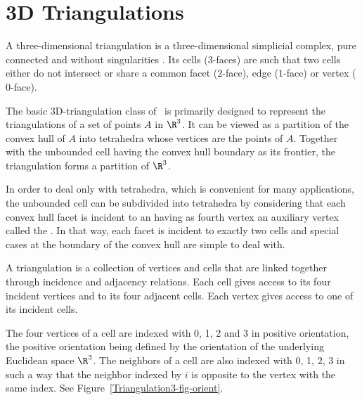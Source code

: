 

\chapter{3D Triangulations}

A three-dimensional triangulation is a three-dimensional simplicial
complex, pure connected and without singularities \cite{by-ag-98}. Its
cells ($3$-faces) are such that two cells either do not intersect or
share a common facet ($2$-face), edge ($1$-face) or vertex ($0$-face).

The basic 3D-triangulation class of \cgal\ is primarily designed to
represent the triangulations of a set of points $A$ in $\R^3$.  It can
be viewed as a partition of the convex hull of {$A$} into tetrahedra
whose vertices are the points of {$A$}.  Together with the unbounded
cell having the convex hull boundary as its frontier, the triangulation
forms a partition of $\R^3$.

In order to deal
only with tetrahedra, which is convenient for many applications, the
unbounded cell can be subdivided into tetrahedra by considering that
each convex hull facet is incident to an  having as
fourth vertex an auxiliary vertex called the .  In
that way, each facet is incident to exactly two cells and special cases
at the boundary of the convex hull are simple to deal with.


A triangulation is a collection of vertices and cells that are linked
together through incidence and adjacency relations. Each cell gives
access to its four incident vertices and to its four adjacent
cells. Each vertex gives access to one of its incident cells.

The four vertices of a cell are indexed with 0, 1, 2 and 3 in positive
orientation, the positive orientation being defined by the orientation
of the underlying Euclidean space $\R^3$. The neighbors of a cell are also
indexed with 0, 1, 2, 3 in such a way that the neighbor indexed by $i$
is opposite to the vertex with the same index. See
Figure~\ref{Triangulation3-fig-orient}.

